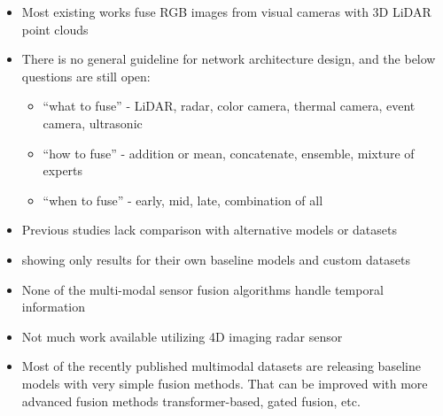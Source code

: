 \documentclass[rnd]{mas_proposal}
\begin{document}
\begin{itemize}


    \item Most existing works fuse RGB images from visual cameras with 3D LiDAR point clouds
          \cite{feng2020deep}

    \item There is no general guideline for network architecture design, and the below questions are still open\cite{Zhou2022May}:
          \begin{itemize}
              \item “what to fuse” - LiDAR, radar, color camera, thermal camera, event camera, ultrasonic
              \item “how to fuse” - addition or mean, concatenate, ensemble, mixture of experts
              \item “when to fuse” - early, mid, late, combination of all
          \end{itemize}

    \item Previous studies lack comparison with alternative models or datasets
    \item showing only results for their own baseline models and custom datasets

    \item None of the multi-modal sensor fusion algorithms handle temporal information
          \cite{bijelic2020seeing}

    \item Not much work available utilizing 4D imaging radar sensor
          \cite{Zhou2022May}

    \item Most of the recently published multimodal datasets are releasing baseline models with very simple fusion methods. That can be improved with more advanced fusion methods transformer-based, gated fusion, etc.






\end{itemize}
\end{document}
